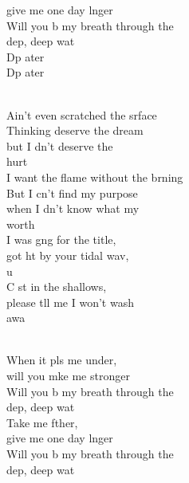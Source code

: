 \begin{cancion}
\begin{chorus}
	give me one day lnger\\
	Will you b my breath through the \\
	dep, deep wat\\
	Dp ater    \\
	Dp ater    \\
	\end{chorus}%
	\jump\\
	Ain't even scratched the srface\\
	Thinking  deserve the dream \\
	but I dn't deserve the \\
	hurt\\
	I want the flame without the brning\\
	But I cn't find my purpose \\
	when I dn't know what my \\
	worth \\
	I was gng for the title, \\
	got ht by your tidal wav, \\
	u\\
	C st in the shallows, \\
	please tll me I won't wash\\
	 awa  \\\jump\\
	\begin{chorus}%
	When it pls me under, \\
	will you mke me stronger\\
	Will you b my breath through the \\
	dep, deep wat\\
	Take me fther, \\
	give me one day lnger\\
	Will you b my breath through the \\
	dep, deep wat\\

\end{chorus}
\end{cancion}
